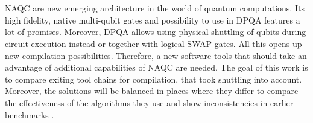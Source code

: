 \chapter{\abstractname}
\ac{NAQC} are new emerging architecture in the world of quantum computations. 
Its high fidelity, native multi-qubit gates and possibility to use in \ac{DPQA} features a lot of promises.
Moreover, \ac{DPQA} allows using physical shuttling of qubits during circuit execution instead or together with logical SWAP gates. 
All this opens up new compilation possibilities. 
Therefore, a new software tools that should take an advantage of additional capabilities of \ac{NAQC} are needed.
The goal of this work is to compare exiting tool chains for compilation, that took shuttling into account.
Moreover, the solutions will be balanced in places where they differ to compare the effectiveness of the algorithms they use and show inconsistencies in earlier benchmarks
\parencite{Tan_2025_Enola, Schmid_2024_NeutralAtomBasics}.
